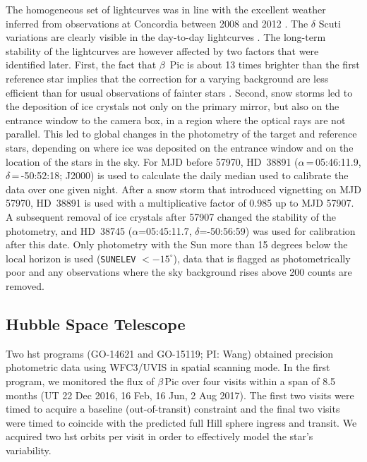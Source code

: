 \documentclass[longauth]{aa} %
\newcommand{\bp}{$\beta$\,Pic}
\begin{document}
The homogeneous set of lightcurves was in line with the excellent weather inferred from observations at Concordia between 2008 and 2012 \citep{Crouzet18}.
%
The $\delta$ Scuti variations are clearly visible in the day-to-day lightcurves \citep[][]{Mekarnia2017}.
%
The long-term stability of the lightcurves are however affected by two factors that were identified later.
%
First, the fact that $\beta$~Pic is about 13 times brighter than the first reference star implies that the correction for a varying background are less efficient than for usual observations of fainter stars \citep[e.g.,][]{Mekarnia16}.
%
Second, snow storms led to the deposition of ice crystals not only on the primary mirror, but also on the entrance window to the camera box, in a region where the optical rays are not parallel.
%
This led to global changes in the photometry of the target and reference stars, depending on where ice was deposited on the entrance window and on the location of the stars in the sky.
%
For MJD before 57970, HD~38891 ($\alpha$\,=\,05:46:11.9, $\delta$\,=\,-50:52:18; J2000) is used to calculate the daily median used to calibrate the data over one given night.
%
After a snow storm that introduced vignetting on MJD 57970, HD~38891 is used with a multiplicative factor of 0.985 up to MJD 57907.
%
A subsequent removal of ice crystals after 57907 changed the stability of the photometry, and HD~38745 ($\alpha$=05:45:11.7, $\delta$=-50:56:59)
 was used for calibration after this date.
%
Only photometry with the Sun more than 15 degrees below the local horizon is used ({\tt SUNELEV} $<-15^{\circ}$), data that is flagged as photometrically poor and any observations where the sky background rises above 200 counts are removed.


\subsection{Hubble Space Telescope}

Two \ac{hst} programs (GO-14621 and GO-15119; PI: Wang) obtained precision photometric data using WFC3/UVIS in spatial scanning mode.
%
In the first program, we monitored the flux of \bp{} over four visits within a span of 8.5 months (UT 22 Dec 2016, 16 Feb, 16 Jun, 2 Aug 2017).
%
The first two visits were timed to acquire a baseline (out-of-transit) constraint and the final two visits were timed to coincide with the predicted full Hill sphere ingress and transit.
%
We acquired two \ac{hst} orbits per visit in order to effectively model the star's variability.
\end{document}
